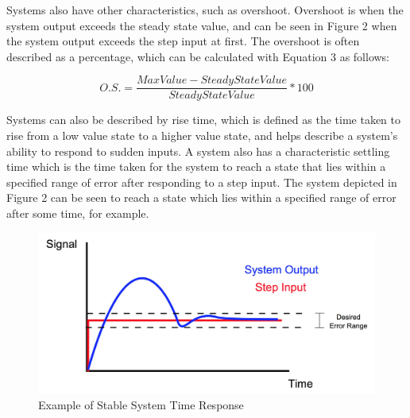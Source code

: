 \documentclass[12pt]{article}
\begin{document}
Systems also have other characteristics, such as overshoot. Overshoot is when the system output exceeds the steady state value, and can be seen in Figure 2 when the system output exceeds the step input at first. The overshoot is often described as a percentage, which can be calculated with Equation 3 as follows:
\bigskip

\begin{equation}
O.S. = \frac{Max Value - Steady State Value}{Steady State Value}*100
\end{equation}
\bigskip

Systems can also be described by rise time, which is defined as the time taken to rise from a low value state to a higher value state, and helps describe a system's ability to respond to sudden inputs. A system also has a characteristic settling time which is the time taken for the system to reach a state that lies within a specified range of error after responding to a step input. The system depicted in Figure 2 can be seen to reach a state which lies within a specified range of error after some time, for example.
\bigskip


\begin{figure}[h!] %
   \centering
   \includegraphics[width=\linewidth]{stable_system.JPG} 
   \caption{Example of Stable System Time Response}
   \label{fig:example}
\end{figure}

\bigskip
\end{document}
